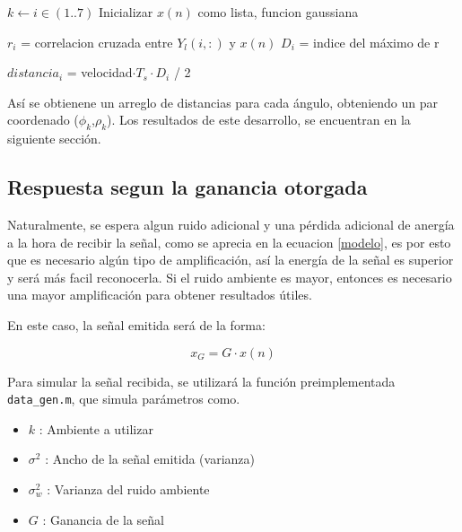 \documentclass[letterpaper,11pt]{article}
\begin{document}
\begin{algorithm}[H]
\begin{algorithmic}
	\State $k \gets i \in (1..7)$
    \State Inicializar $x(n)$ como lista, funcion gaussiana
    
		\State $r_{i}$ = correlacion cruzada entre $Y_{l}(i,:)$ y $x(n)$
		\State $D_{i}$ = indice del máximo de r	
    \EndFor
    
    \State $distancia_{i}$ = velocidad$\cdot T_{s} \cdot D_{i}$ / 2
\end{algorithmic}
\end{algorithm}




Así se obtienene un arreglo de distancias para cada ángulo, obteniendo un par coordenado ($\phi_{k}$,$\rho_{k}$). Los resultados de este desarrollo, se encuentran en la siguiente sección.

\subsection{Respuesta segun la ganancia otorgada}

Naturalmente, se espera algun ruido adicional y una pérdida adicional de anergía a la hora de recibir la señal, como se aprecia en la ecuacion \eqref{modelo}, es por esto que es necesario algún tipo de amplificación, así la energía de la señal es superior y será más facil reconocerla. Si el ruido ambiente es mayor, entonces es necesario una mayor amplificación para obtener resultados útiles.\par

En este caso, la señal emitida será de la forma:

\begin{equation}
x_{G} = G\cdot x(n)
\end{equation}

Para simular la señal recibida, se utilizará la función preimplementada \texttt{data\_gen.m}, que simula parámetros como.

\begin{itemize}

\item $k$ : Ambiente a utilizar

\item $\sigma^2$ : Ancho de la señal emitida (varianza)

\item $\sigma_{w}^2$ : Varianza del ruido ambiente

\item $G$ : Ganancia de la señal

\end{itemize}
\end{document}
